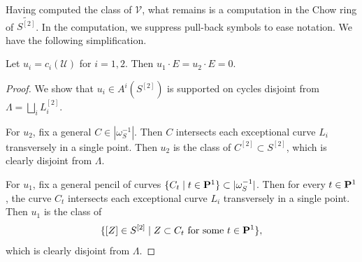 \documentclass[reqno]{amsart}
\renewcommand {\P}{{\bf P}}
\numberwithin{equation}{section}
\begin{document}
Having computed the class of $\mathcal{V}$, what remains is a computation in the Chow ring of $\widetilde{S^{[2]}}$.
In the computation, we suppress pull-back symbols to ease notation.
We have the following simplification.
\begin{proposition}
    \label{lemma:uE}
  Let $u_i = c_i(\mathcal{U})$ for $i = 1, 2$.
  Then  $u_{1}\cdot E = u_{2} \cdot E = 0$.
\end{proposition}
\begin{proof}
  We show that $u_i \in A^i(S^{[2]})$ is supported on cycles disjoint from $\Lambda = \bigsqcup_i L^{[2]}_i$.

  For $u_2$, fix a general $C \in |\omega_S^{-1}|$.
  Then $C$ intersects each exceptional curve $L_i$ transversely in a single point.
  Then $u_2$ is the class of $C^{[2]} \subset S^{[2]}$, which is clearly disjoint from $\Lambda$.

  For $u_1$, fix a general pencil of curves $\{C_t \mid t \in \P^1\} \subset |\omega_S^{-1}|$.
  Then for every $t \in \P^1$, the curve $C_t$ intersects each exceptional curve $L_i$ transversely in a single point.
  Then $u_{1}$ is the class of
  \[\{[Z] \in S^{[2]} \mid Z \subset C_{t} \text{ for some $t\in \P^{1}$}\},\]
  which is clearly disjoint from $\Lambda$.
\end{proof}
\end{document}
